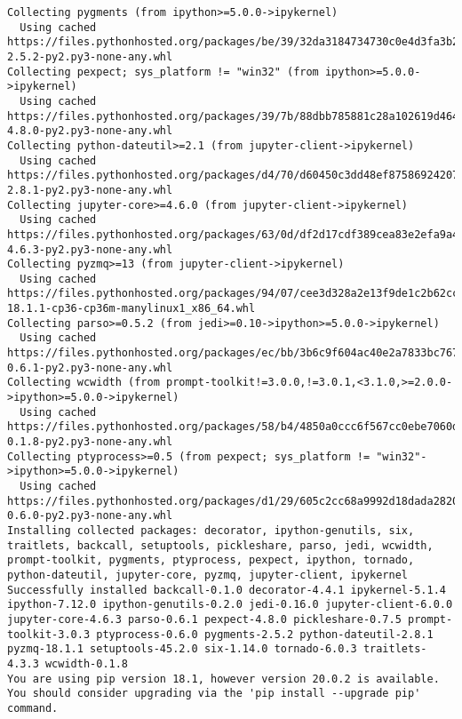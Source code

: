 \documentclass[11pt,a4paper]{article}
\begin{document}
\begin{verbatim}
Collecting pygments (from ipython>=5.0.0->ipykernel)
  Using cached https://files.pythonhosted.org/packages/be/39/32da3184734730c0e4d3fa3b2b5872104668ad6dc1b5a73d8e477e5fe967/Pygments-2.5.2-py2.py3-none-any.whl
Collecting pexpect; sys_platform != "win32" (from ipython>=5.0.0->ipykernel)
  Using cached https://files.pythonhosted.org/packages/39/7b/88dbb785881c28a102619d46423cb853b46dbccc70d3ac362d99773a78ce/pexpect-4.8.0-py2.py3-none-any.whl
Collecting python-dateutil>=2.1 (from jupyter-client->ipykernel)
  Using cached https://files.pythonhosted.org/packages/d4/70/d60450c3dd48ef87586924207ae8907090de0b306af2bce5d134d78615cb/python_dateutil-2.8.1-py2.py3-none-any.whl
Collecting jupyter-core>=4.6.0 (from jupyter-client->ipykernel)
  Using cached https://files.pythonhosted.org/packages/63/0d/df2d17cdf389cea83e2efa9a4d32f7d527ba78667e0153a8e676e957b2f7/jupyter_core-4.6.3-py2.py3-none-any.whl
Collecting pyzmq>=13 (from jupyter-client->ipykernel)
  Using cached https://files.pythonhosted.org/packages/94/07/cee3d328a2e13f9de1c2b62cced7a389b61ac81424f2e377f3dc9d668282/pyzmq-18.1.1-cp36-cp36m-manylinux1_x86_64.whl
Collecting parso>=0.5.2 (from jedi>=0.10->ipython>=5.0.0->ipykernel)
  Using cached https://files.pythonhosted.org/packages/ec/bb/3b6c9f604ac40e2a7833bc767bd084035f12febcbd2b62204c5bc30edf97/parso-0.6.1-py2.py3-none-any.whl
Collecting wcwidth (from prompt-toolkit!=3.0.0,!=3.0.1,<3.1.0,>=2.0.0->ipython>=5.0.0->ipykernel)
  Using cached https://files.pythonhosted.org/packages/58/b4/4850a0ccc6f567cc0ebe7060d20ffd4258b8210efadc259da62dc6ed9c65/wcwidth-0.1.8-py2.py3-none-any.whl
Collecting ptyprocess>=0.5 (from pexpect; sys_platform != "win32"->ipython>=5.0.0->ipykernel)
  Using cached https://files.pythonhosted.org/packages/d1/29/605c2cc68a9992d18dada28206eeada56ea4bd07a239669da41674648b6f/ptyprocess-0.6.0-py2.py3-none-any.whl
Installing collected packages: decorator, ipython-genutils, six, traitlets, backcall, setuptools, pickleshare, parso, jedi, wcwidth, prompt-toolkit, pygments, ptyprocess, pexpect, ipython, tornado, python-dateutil, jupyter-core, pyzmq, jupyter-client, ipykernel
Successfully installed backcall-0.1.0 decorator-4.4.1 ipykernel-5.1.4 ipython-7.12.0 ipython-genutils-0.2.0 jedi-0.16.0 jupyter-client-6.0.0 jupyter-core-4.6.3 parso-0.6.1 pexpect-4.8.0 pickleshare-0.7.5 prompt-toolkit-3.0.3 ptyprocess-0.6.0 pygments-2.5.2 python-dateutil-2.8.1 pyzmq-18.1.1 setuptools-45.2.0 six-1.14.0 tornado-6.0.3 traitlets-4.3.3 wcwidth-0.1.8
You are using pip version 18.1, however version 20.0.2 is available.
You should consider upgrading via the 'pip install --upgrade pip' command.
\end{verbatim}
\end{document}

